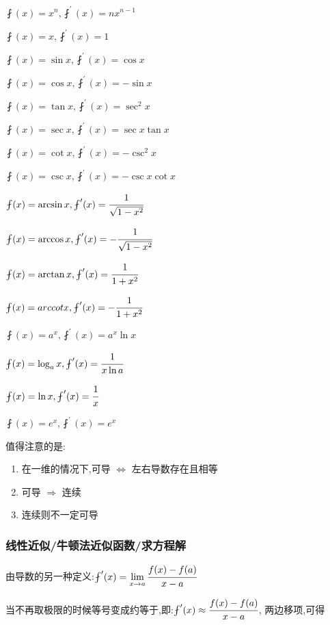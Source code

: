 \documentclass[UTF8,12pt]{ctexbook}
\newcommand{\limNormal}[1]{\lim\limits_{#1}}
\newcommand{\derivative}{^\prime}
\newcommand{\fDerivative}[1]{\fint\derivative(#1)}
\newcommand{\defFunction}[1]{f(#1)}
\begin{document}
{{{{    $\fint(x) = x^n, \fint\derivative(x) = nx^{n-1}$

    $\fint(x) = x, \fint\derivative(x) = 1$

    $\fint(x) = \sin x, \fint\derivative(x) = \cos x$

    $\fint(x) = \cos x, \fint\derivative(x) = -\sin x$

    $\fint(x) = \tan x, \fint\derivative(x) = \sec^2 x$

    $\fint(x) = \sec x, \fint\derivative(x) = \sec x\tan x$

    $\fint(x) = \cot x, \fint\derivative(x) = -\csc^2 x$

    $\fint(x) = \csc x, \fint\derivative(x) = -\csc x\cot x$

    $\fint(x) = \arcsin x, \fint\derivative(x) = \cfrac{1}{\sqrt{1 - x^2}}$

    $\fint(x) = \arccos x, \fint\derivative(x) = -\cfrac{1}{\sqrt{1 - x^2}}$

    $\fint(x) = \arctan x, \fint\derivative(x) = \cfrac{1}{1 + x^2}$

    $\fint(x) = arccotx, \fint\derivative(x) = -\cfrac{1}{1 + x^2}$

    $\fint(x) = a^x, \fint\derivative(x) = a^x\ln x$

    $\fint(x) = \log_a x, \fint\derivative(x) = \cfrac{1}{x\ln a}$

    $\fint(x) = \ln x, \fint\derivative(x)= \cfrac{1}{x}$

    $\fint(x) = e^x, \fint\derivative(x) = e^x$
  }%
  \newline

  值得注意的是:
  \begin{enumerate}
    \item 在一维的情况下,可导 $\Leftrightarrow$ 左右导数存在且相等

    \item 可导 $\Rightarrow$ 连续

    \item 连续则不一定可导
  \end{enumerate}

  \subsubsection{线性近似/牛顿法近似函数/求方程解}{
    由导数的另一种定义:$\fDerivative{x} = \limNormal{x \to a}\cfrac{\defFunction{x} - \defFunction{a}}{x - a}$

    当不再取极限的时候等号变成约等于,即:$\fDerivative{x} \approx \cfrac{\defFunction{x} - \defFunction{a}}{x - a}$, 两边移项,可得

}}}}
\end{document}
